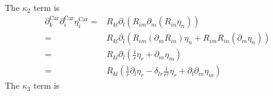 \documentclass[aps,prl,preprint]{revtex4-2}
\begin{document}
The $\kappa_2$ term is
\begin{align}
    \partial_k^\text{Car}\partial_i^\text{Car}\eta_i^\text{Car}= & R_{kl}\partial_l(R_{im}\partial_m(R_{in}\eta_n))                                  \\
    =                                                            & R_{kl}\partial_l(R_{im}(\partial_mR_{in})\eta_n + R_{im}R_{in}(\partial_m\eta_n)) \\
    =                                                            & R_{kl}\partial_l\left(\frac{1}{r}\eta_r + \partial_m\eta_m\right)                 \\
    =                                                            & R_{kl}\left(\frac{1}{r}\partial_l\eta_r - \delta_{lr}\frac{1}{r^2}\eta_r
    + \partial_l\partial_m\eta_m\right)
\end{align}
The $\kappa_3$ term is
\end{document}
